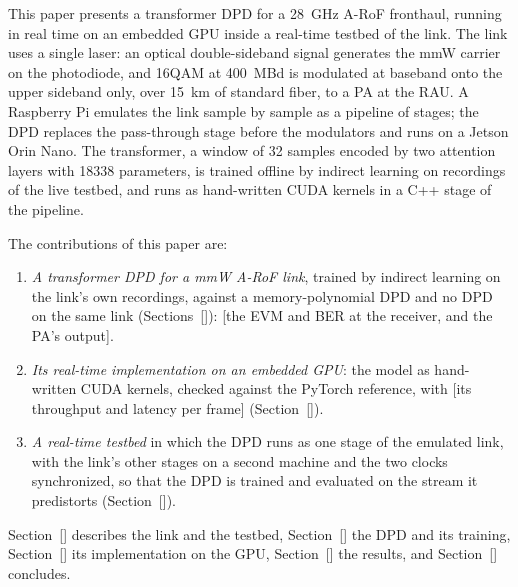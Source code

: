 \documentclass[journal]{IEEEtran}
\newcommand{\tbd}[1]{{\color{red!75!black}[#1]}}
\begin{document}
This paper presents a transformer DPD for a \SI{28}{GHz} A-RoF fronthaul, running in real time on
an embedded GPU inside a real-time testbed of the link. The link uses a single laser: an optical
double-sideband signal generates the mmW carrier on the photodiode, and 16QAM at
\SI{400}{MBd} is modulated at baseband onto the upper sideband only, over \SI{15}{km} of
standard fiber, to a PA at the RAU. A Raspberry Pi emulates the link sample by sample as a pipeline
of stages; the DPD replaces the pass-through stage before the modulators and runs on a Jetson Orin
Nano. The transformer, a window of 32 samples encoded by two attention layers with
\num{18338} parameters, is trained offline by indirect learning on recordings of the live
testbed, and runs as hand-written CUDA kernels in a C++ stage of the pipeline.

The contributions of this paper are:
\begin{enumerate}
\item \emph{A transformer DPD for a mmW A-RoF link}, trained by indirect learning on the link's
own recordings, against a memory-polynomial DPD and no DPD on the same link
(Sections~\tbd{}): \tbd{the EVM and BER at the receiver, and the PA's output}.
\item \emph{Its real-time implementation on an embedded GPU}: the model as hand-written CUDA
kernels, checked against the PyTorch reference, with \tbd{its throughput and latency per frame}
(Section~\tbd{}).
\item \emph{A real-time testbed} in which the DPD runs as one stage of the emulated link, with the
link's other stages on a second machine and the two clocks synchronized, so that the DPD is trained
and evaluated on the stream it predistorts (Section~\tbd{}).
\end{enumerate}

Section~\tbd{} describes the link and the testbed, Section~\tbd{} the DPD and its training,
Section~\tbd{} its implementation on the GPU, Section~\tbd{} the results, and
Section~\tbd{} concludes.



\end{document}

